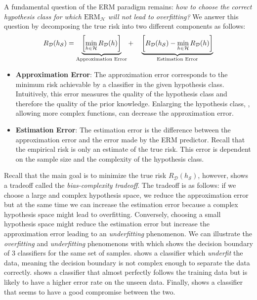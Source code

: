 A fundamental question of the ERM paradigm remains: \emph{how to choose the correct hypothesis class for which $\text{ERM}_\mathcal{H}$ will not lead to overfitting?} 
We answer this question by decomposing the true risk into two different components as follows: 
\begin{equation} \label{equation:ch2-bias_complexity_tradeoff}
  R_\mathcal{D} (h_\mathcal{S}) = 
  \underbrace{\left[ \min_{h \in \mathcal{H}} R_\mathcal{D}(h) \right]}_{\text{\scriptsize Approximation Error}} + \quad 
  \underbrace{\left[ R_\mathcal{D}(h_\mathcal{S}) - \min_{h \in \mathcal{H}} R_\mathcal{D}(h) \right]}_{\text{\scriptsize Estimation Error}} 
\end{equation}
\begin{itemize}
  \item \textbf{Approximation Error}: The approximation error corresponds to the minimum risk achievable by a classifier in the given hypothesis class.
  Intuitively, this error measures the quality of the hypothesis class and therefore the quality of the prior knowledge.
  Enlarging the hypothesis class, \ie, allowing more complex functions, can decrease the approximation error.
  \item \textbf{Estimation Error}: The estimation error is the difference between the approximation error and the error made by the ERM predictor.
  Recall that the empirical risk is only an estimate of the true risk.
  This error is dependent on the sample size and the complexity of the hypothesis class. 
\end{itemize}
Recall that the main goal is to minimize the true risk $R_\mathcal{D} (h_\mathcal{S})$, however,  shows a tradeoff called the \emph{bias-complexity tradeoff}.
The tradeoff is as follows: if we choose a large and complex hypothesis space, we reduce the approximation error but at the same time we can increase the estimation error because a complex hypothesis space might lead to overfitting.
Conversely, choosing a small hypothesis space might reduce the estimation error but increase the approximation error leading to an \emph{underfitting} phenomenon.
We can illustrate the \emph{overfitting} and \emph{underfitting} phenomenons with  which shows the decision boundary of 3 classifiers for the same set of samples.
 shows a classifier which \emph{underfit} the data, meaning the decision boundary is not complex enough to separate the data correctly.
 shows a classifier that almost perfectly follows the training data but is likely to have a higher error rate on the unseen data.
Finally,  shows a classifier that seems to have a good compromise between the two.


